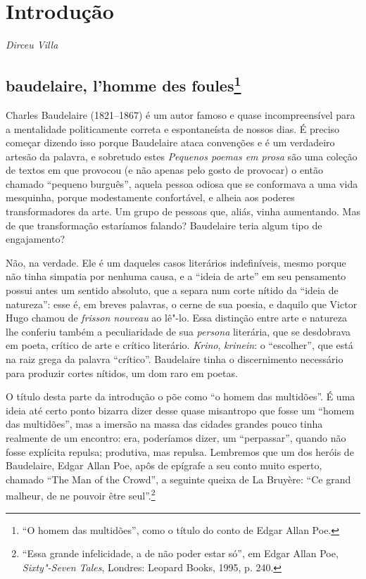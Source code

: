 \chapter*{Introdução}

\begin{flushright}
\emph{Dirceu Villa}
\end{flushright}

\section*{baudelaire, l'homme des foules\protect\footnote{ “\uppercase{O} homem das
multidões”, como o título do conto de \uppercase{E}dgar \uppercase{A}llan \uppercase{P}oe.}}
Charles Baudelaire (1821--1867) é um autor famoso e quase
incompreensível para a mentalidade politicamente correta e
espontaneísta de nossos dias. É preciso começar dizendo isso porque
Baudelaire ataca convenções e é um verdadeiro artesão da palavra, e
sobretudo estes \textit{Pequenos poemas em prosa} são uma coleção de
textos em que provocou (e não apenas pelo gosto de provocar) o então
chamado “pequeno burguês”, aquela pessoa odiosa que se conformava a uma
vida mesquinha, porque modestamente confortável, e alheia aos poderes
transformadores da arte. Um grupo de pessoas que, aliás, vinha
aumentando. Mas de que transformação estaríamos falando? Baudelaire
teria algum tipo de engajamento?

Não, na verdade. Ele é um daqueles casos literários indefiníveis, mesmo
porque não tinha simpatia por nenhuma causa, e a “ideia de arte”
em seu pensamento possui antes um sentido absoluto, que a separa num
corte nítido da “ideia de natureza”: esse é, em breves palavras,
o cerne de sua poesia, e daquilo que Victor Hugo chamou de \textit{frisson
nouveau} ao lê"-lo. Essa distinção entre arte e natureza lhe
conferiu também a peculiaridade de sua \textit{persona} literária, que
se desdobrava em poeta, crítico de arte e crítico literário. \textit{Krino},
\textit{krinein}: o “escolher”, que está na raiz grega da palavra
 “crítico”. Baudelaire tinha o discernimento necessário para
produzir cortes nítidos, um dom raro em poetas.

O título desta parte da introdução o põe como “o homem das multidões”. É uma ideia
até certo ponto bizarra dizer desse quase misantropo que fosse
um “homem das multidões”, mas a imersão na massa das cidades grandes
pouco tinha realmente de um encontro: era, poderíamos dizer, um
 “perpassar”, quando não fosse explícita repulsa; produtiva, mas
repulsa. Lembremos que um dos heróis de Baudelaire, Edgar Allan Poe,
apôs de epígrafe a seu conto muito esperto, chamado “The Man of the
Crowd”, a seguinte queixa de La Bruyère: “Ce grand malheur, de ne
pouvoir être seul”.\footnote{ “Essa grande infelicidade, a de não poder
estar só”, em Edgar Allan Poe, \textit{Sixty"-Seven Tales}, Londres: Leopard
Books, 1995, p. 240.}

